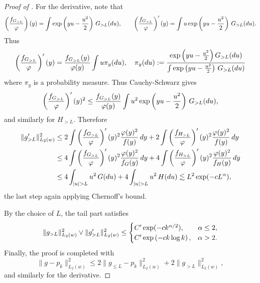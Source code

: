 \documentclass[letterpaper,11pt]{article}
\def\exp{\mathop{\rm exp}}
\newcommand{\pth}[1]{\left( #1 \right)}
\theoremstyle{definition}
\begin{document}
\begin{proof}[Proof of ]
  For the derivative, note that
  \[
   \left(\frac{f_{G_{>L}}}{\varphi}\right)(y)
  = \int \exp\pth{yu-\frac{u^2}{2}}\,G_{>L}(du), \qquad
   \left(\frac{f_{G_{>L}}}{\varphi}\right)'(y)
  = \int u \exp\pth{yu-\frac{u^2}{2}}\,G_{>L}(du).
  \]
  Thus
  \[
  \left(\frac{f_{G_{>L}}}{\varphi}\right)'(y)
  =
  \frac{f_{G_{>L}}(y)}{\varphi(y)}
  \int u \pi_y(du), \quad
  \pi_y(du) := \frac{ \exp\pth{yu-\frac{u^2}{2}}
G_{>L}(du)
  }{\int \exp\pth{yu-\frac{u^2}{2}}\,G_{>L}(du)}
  \]
  where $\pi_y$ is a probability measure. Thus Cauchy-Schwarz gives
  \[
    \left(\frac{f_{G_{>L}}}{\varphi}\right)'(y)^2
    \leq
    \frac{f_{G_{>L}}(y)}{\varphi(y)}
    \int u^2 \exp\pth{yu-\frac{u^2}{2}}\,G_{>L}(du),
  \]
  and similarly for $H_{>L}$. Therefore
  \begin{align*}
    \|g_{>L}'\|_{L_2(w)}^2
    &\leq
    2 \int \left(\frac{f_{G_{>L}}}{\varphi}\right)'(y)^2
    \frac{\varphi(y)^2}{f(y)}\,dy
    +
    2 \int \left(\frac{f_{H_{>L}}}{\varphi}\right)'(y)^2
    \frac{\varphi(y)^2}{f(y)}\,dy\\
    &\leq
    4 \int \left(\frac{f_{G_{>L}}}{\varphi}\right)'(y)^2
    \frac{\varphi(y)^2}{f_G(y)}\,dy
    +
    4 \int \left(\frac{f_{H_{>L}}}{\varphi}\right)'(y)^2
    \frac{\varphi(y)^2}{f_H(y)}\,dy\\
    &\leq
    4 \int_{|u|>L} u^2\,G(du)
    +
    4 \int_{|u|>L} u^2\,H(du) \lesssim
    L^2 \exp(-c L^\alpha),
  \end{align*}
  the last step again applying Chernoff's bound.

  By the choice of $L$, the tail part satisfies
  \[
    \|g_{>L}\|_{L_2(w)}^2
    \vee
    \|g_{>L}'\|_{L_2(w)}^2
    \leq
    \begin{cases}
      C' \exp(-c k^{\alpha/2}),
      & \alpha\leq 2,\\
      C' \exp\pth{-c k\log k},
      & \alpha>2.
    \end{cases}
  \]
  Finally, the proof is completed with
  \[
    \|g-p_k\|_{L_2(w)}^2
    \leq
    2\|g_{\leq L}-p_k\|_{L_2(w)}^2
    +
    2\|g_{>L}\|_{L_2(w)}^2,
  \]
  and similarly for the derivative.
\end{proof}


    \appendix
\end{document}
